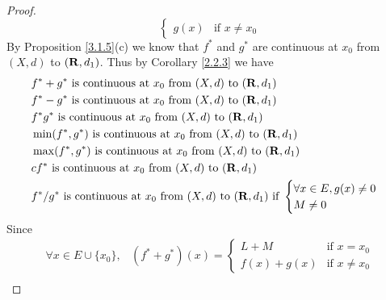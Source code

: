 \begin{proof}
\[\begin{cases}
            g(x) & \text{if } x \neq x_0
        \end{cases}
    \]
    By Proposition \ref{3.1.5}(c) we know that \(f^*\) and \(g^*\) are continuous at \(x_0\) from \((X, d)\) to \((\mathbf{R}, d_1)\).
    Thus by Corollary \ref{2.2.3} we have
    \begin{align*}
         & f^* + g^* \text{ is continuous at } x_0 \text{ from } (X, d) \text{ to } (\mathbf{R}, d_1)                                          \\
         & f^* - g^* \text{ is continuous at } x_0 \text{ from } (X, d) \text{ to } (\mathbf{R}, d_1)                                          \\
         & f^* g^* \text{ is continuous at } x_0 \text{ from } (X, d) \text{ to } (\mathbf{R}, d_1)                                            \\
         & \min(f^*, g^*) \text{ is continuous at } x_0 \text{ from } (X, d) \text{ to } (\mathbf{R}, d_1)                                     \\
         & \max(f^*, g^*) \text{ is continuous at } x_0 \text{ from } (X, d) \text{ to } (\mathbf{R}, d_1)                                     \\
         & c f^* \text{ is continuous at } x_0 \text{ from } (X, d) \text{ to } (\mathbf{R}, d_1)                                              \\
         & f^* / g^* \text{ is continuous at } x_0 \text{ from } (X, d) \text{ to } (\mathbf{R}, d_1) \text{ if } \begin{cases}
                                                                                                              \forall x \in E, g(x) \neq 0 \\
                                                                                                              M \neq 0
                                                                                                          \end{cases}
    \end{align*}
    Since
    \begin{align*}
        \forall x \in E \cup \{x_0\}, & (f^* + g^*)(x) = \begin{cases}
                                                             L + M       & \text{if } x = x_0    \\
                                                             f(x) + g(x) & \text{if } x \neq x_0
                                                         \end{cases}                    \\

\end{align*}
\end{proof}
